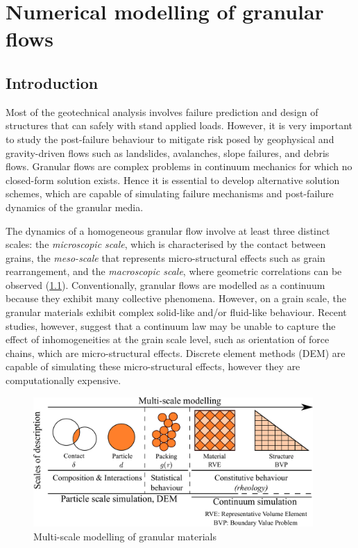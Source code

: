\chapter{Numerical modelling of granular flows}

\ifpdf
    \graphicspath{{Chapter3/figs/raster/}{Chapter3/figs/pdf/}{Chapter3/figs/}}
\else
    \graphicspath{{Chapter3/figs/vector/}{Chapter3/figs/}}
\fi

\section{Introduction}

Most of the geotechnical analysis involves failure prediction and design of 
structures that can safely with stand applied loads. However, it is very 
important to study the post-failure behaviour to mitigate risk posed by 
geophysical and gravity-driven flows such as landslides, avalanches, slope 
failures, and debris flows. Granular flows are complex problems in continuum 
mechanics for which no closed-form solution exists. Hence it is essential to 
develop alternative solution schemes, which are capable of simulating failure 
mechanisms and post-failure dynamics of the granular media. 

The dynamics of a homogeneous granular flow involve at least three distinct 
scales: the \textit{microscopic scale}, which is characterised by the contact 
between grains, the \textit{meso-scale} that represents micro-structural 
effects such as grain rearrangement, and the \textit{macroscopic scale}, where 
geometric correlations can be observed (\cref{fig:multiscale}). Conventionally, 
granular flows are modelled as a continuum because they exhibit many collective 
phenomena. However, on a grain scale, the granular materials exhibit complex 
solid-like and/or fluid-like behaviour. Recent studies, however, suggest that a 
continuum law may be unable to capture the effect of inhomogeneities at the 
grain scale level, such as orientation of force chains, which are 
micro-structural effects. Discrete element methods (DEM) are capable of 
simulating these micro-structural effects, however they are computationally 
expensive. 

\begin{figure}[tbhp]
\centering
\includegraphics[width=0.95\textwidth]{multiscale}
\caption{Multi-scale modelling of granular materials}
\label{fig:multiscale}
\end{figure}


